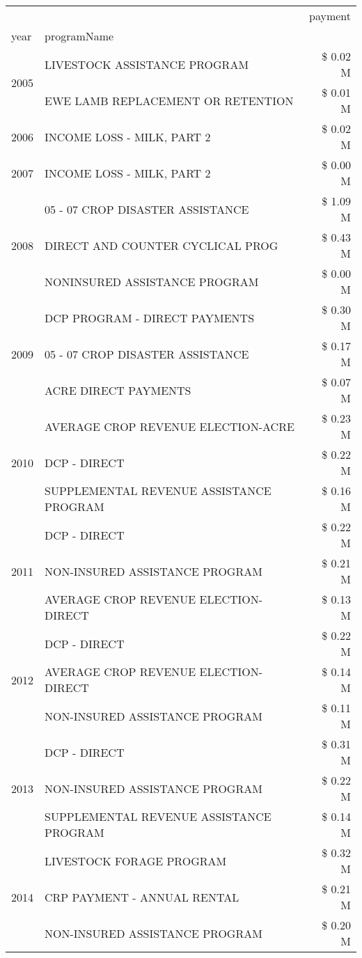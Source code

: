 \begin{tabular}{llr}
\toprule
 &  & payment \\
year & programName &  \\
\midrule
\multirow[t]{2}{*}{2005} & LIVESTOCK ASSISTANCE PROGRAM & \$ 0.02 M \\
 & EWE LAMB REPLACEMENT OR RETENTION & \$ 0.01 M \\
\cline{1-3}
2006 & INCOME LOSS - MILK, PART 2 & \$ 0.02 M \\
\cline{1-3}
2007 & INCOME LOSS - MILK, PART 2 & \$ 0.00 M \\
\cline{1-3}
\multirow[t]{3}{*}{2008} & 05 - 07 CROP DISASTER ASSISTANCE & \$ 1.09 M \\
 & DIRECT AND COUNTER CYCLICAL PROG & \$ 0.43 M \\
 & NONINSURED ASSISTANCE PROGRAM & \$ 0.00 M \\
\cline{1-3}
\multirow[t]{3}{*}{2009} & DCP PROGRAM - DIRECT PAYMENTS & \$ 0.30 M \\
 & 05 - 07 CROP DISASTER ASSISTANCE & \$ 0.17 M \\
 & ACRE DIRECT PAYMENTS & \$ 0.07 M \\
\cline{1-3}
\multirow[t]{3}{*}{2010} & AVERAGE CROP REVENUE ELECTION-ACRE & \$ 0.23 M \\
 & DCP - DIRECT & \$ 0.22 M \\
 & SUPPLEMENTAL REVENUE ASSISTANCE PROGRAM & \$ 0.16 M \\
\cline{1-3}
\multirow[t]{3}{*}{2011} & DCP - DIRECT & \$ 0.22 M \\
 & NON-INSURED ASSISTANCE PROGRAM & \$ 0.21 M \\
 & AVERAGE CROP REVENUE ELECTION-DIRECT & \$ 0.13 M \\
\cline{1-3}
\multirow[t]{3}{*}{2012} & DCP - DIRECT & \$ 0.22 M \\
 & AVERAGE CROP REVENUE ELECTION-DIRECT & \$ 0.14 M \\
 & NON-INSURED ASSISTANCE PROGRAM & \$ 0.11 M \\
\cline{1-3}
\multirow[t]{3}{*}{2013} & DCP - DIRECT & \$ 0.31 M \\
 & NON-INSURED ASSISTANCE PROGRAM & \$ 0.22 M \\
 & SUPPLEMENTAL REVENUE ASSISTANCE PROGRAM & \$ 0.14 M \\
\cline{1-3}
\multirow[t]{3}{*}{2014} & LIVESTOCK FORAGE PROGRAM & \$ 0.32 M \\
 & CRP PAYMENT - ANNUAL RENTAL & \$ 0.21 M \\
 & NON-INSURED ASSISTANCE PROGRAM & \$ 0.20 M \\

\end{tabular}
